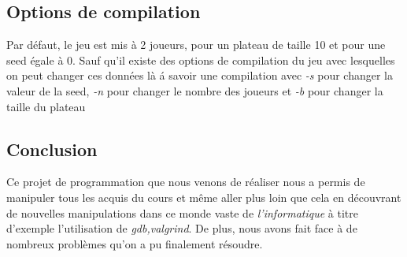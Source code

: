 \documentclass[12pt,a4paper]{extarticle}
\begin{document}
    \subsection{Options de compilation}
    Par d\'efaut, le jeu est mis \`a 2 joueurs, pour un plateau de taille 10 et pour une seed \'egale \`a 0.
    Sauf qu'il existe des options de compilation du jeu avec lesquelles on peut changer ces donn\'ees l\`a \'a savoir une compilation avec \emph{-s} pour changer la valeur
    de la seed, \emph{-n} pour changer le nombre des joueurs et \emph{-b} pour changer la taille du plateau
    \subsection{Conclusion}
    Ce projet de programmation que nous venons de r\'ealiser nous a permis de manipuler tous les acquis du cours et m\^eme aller plus loin que cela en d\'ecouvrant de nouvelles 
    manipulations dans ce monde vaste de \emph{l'informatique} \`a titre d'exemple l'utilisation de \emph{gdb,valgrind}. De plus, nous avons fait face \`a de nombreux probl\`emes qu'on 
    a pu finalement r\'esoudre.
\end{document}
